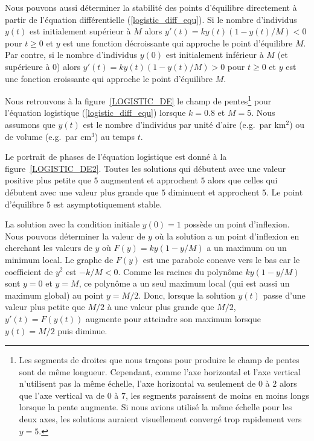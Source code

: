 {Nous pouvons aussi déterminer la stabilité des points d'équilibre
directement à partir de l'équation différentielle
(\ref{logistic_diff_equ}).   Si le nombre d'individus $y(t)$ est
initialement supérieur à $M$ alors $y'(t) = ky(t)(1-y(t)/M)< 0$
pour $t\geq 0$ et $y$ est une fonction décroissante qui approche le
point d'équilibre $M$.  Par contre, si le nombre d'individus $y(0)$
est initialement inférieur à $M$ (et supérieure à $0$) alors
$y'(t) = k y(t)(1-y(t)/M)>0$ pour $t\geq 0$ et $y$ est une fonction
croissante qui approche le point d'équilibre $M$.

Nous retrouvons à la figure~\ref{LOGISTIC_DE} le champ de
pentes\footnote{Les segments de droites que nous traçons pour produire
  le champ de pentes sont de même longueur.  Cependant, comme l'axe
  horizontal et l'axe vertical n'utilisent pas la même échelle, l'axe
  horizontal va seulement de $0$ à $2$ alors que l'axe vertical va de
  $0$ à $7$, les segments paraissent de moins en moins longs lorsque
  la pente augmente.  Si nous avions utilisé la même échelle pour les deux
  axes, les solutions auraient visuellement convergé trop rapidement
  vers $y=5$.}
pour l'équation logistique (\ref{logistic_diff_equ}) lorsque $k=0.8$
et $M=5$. Nous assumons que $y(t)$ est le nombre d'individus par unité
d'aire (e.g.\ par km$^2$) ou de volume (e.g.\ par cm$^3$) au temps $t$.

Le portrait de phases de l'équation logistique est donné à la
figure~\ref{LOGISTIC_DE2}.  Toutes les solutions qui débutent avec une
valeur positive plus petite que $5$ augmentent et approchent $5$ alors que
celles qui débutent avec une valeur plus grande que $5$ diminuent et
approchent $5$.  Le point d'équilibre $5$ est asymptotiquement
stable.



La solution avec la condition initiale $y(0)=1$ possède un point
d'inflexion.  Nous pouvons déterminer la valeur de $y$ où la solution a un
point d'inflexion en cherchant les valeurs de $y$ où
$F(y) = ky(1-y/M)$ a un maximum ou un minimum local.  Le graphe de
$F(y)$ est une parabole concave vers le bas car le coefficient de
$y^2$ est $-k/M < 0$.  Comme les racines du polynôme $ky(1-y/M)$ sont
$y=0$ et $y=M$, ce polynôme a un seul maximum local (qui est aussi un
maximum global) au point $y = M/2$.  Donc, lorsque la solution $y(t)$
passe d'une valeur plus petite que $M/2$ à une valeur plus grande que
$M/2$, $y'(t) = F(y(t))$ augmente pour atteindre son maximum lorsque
$y(t) = M/2$ puis diminue. 

}
